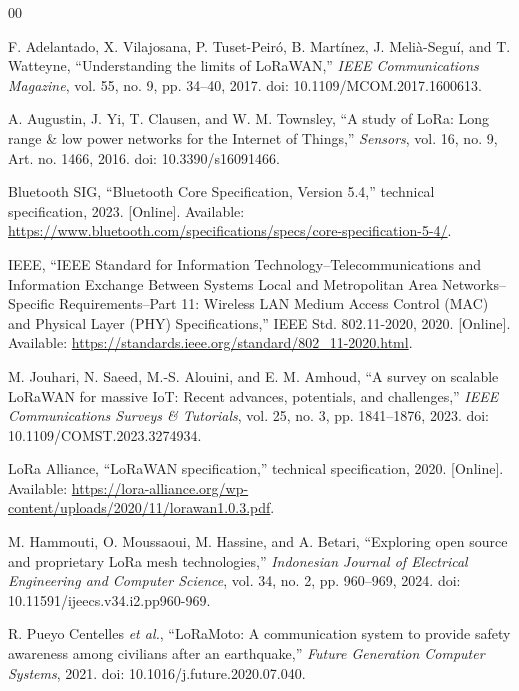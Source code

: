 \documentclass[journal]{IEEEtran}
\begin{document}
\begin{thebibliography}{00}

F. Adelantado, X. Vilajosana, P. Tuset-Peir\'o, B. Mart\'inez,
  J. Meli\`a-Segu\'i,
  and T. Watteyne, ``Understanding the limits of LoRaWAN,''
  \emph{IEEE Communications Magazine}, vol. 55, no. 9, pp. 34--40, 2017.
  doi: 10.1109/MCOM.2017.1600613.

A. Augustin, J. Yi, T. Clausen, and W. M. Townsley, ``A study of LoRa:
  Long range \& low power networks for the Internet of Things,''
  \emph{Sensors}, vol. 16, no. 9, Art. no. 1466, 2016.
  doi: 10.3390/s16091466.

Bluetooth SIG, ``Bluetooth Core Specification, Version 5.4,'' technical
  specification, 2023. [Online]. Available:
  \url{https://www.bluetooth.com/specifications/specs/core-specification-5-4/}.

IEEE, ``IEEE Standard for Information Technology--Telecommunications and
  Information Exchange Between Systems Local and Metropolitan Area Networks--
  Specific Requirements--Part 11: Wireless LAN Medium Access Control (MAC)
  and Physical Layer (PHY) Specifications,'' IEEE Std. 802.11-2020, 2020.
  [Online]. Available: \url{https://standards.ieee.org/standard/802_11-2020.html}.

M. Jouhari, N. Saeed, M.-S. Alouini, and E. M. Amhoud, ``A survey on
  scalable LoRaWAN for massive IoT: Recent advances, potentials, and
  challenges,'' \emph{IEEE Communications Surveys \& Tutorials}, vol. 25,
  no. 3, pp. 1841--1876, 2023. doi: 10.1109/COMST.2023.3274934.

LoRa Alliance, ``LoRaWAN specification,'' technical specification,
2020. [Online]. Available:
 \url{https://lora-alliance.org/wp-content/uploads/2020/11/lorawan1.0.3.pdf}.

M. Hammouti, O. Moussaoui, M. Hassine, and A. Betari, ``Exploring open
  source and proprietary LoRa mesh technologies,'' \emph{Indonesian
  Journal of Electrical Engineering and Computer Science}, vol. 34, no. 2,
  pp. 960--969, 2024. doi: 10.11591/ijeecs.v34.i2.pp960-969.

R. Pueyo Centelles \emph{et al.}, ``LoRaMoto: A communication system to
  provide safety awareness among civilians after an earthquake,''
  \emph{Future Generation Computer Systems}, 2021.
  doi: 10.1016/j.future.2020.07.040.


\end{thebibliography}
\end{document}
